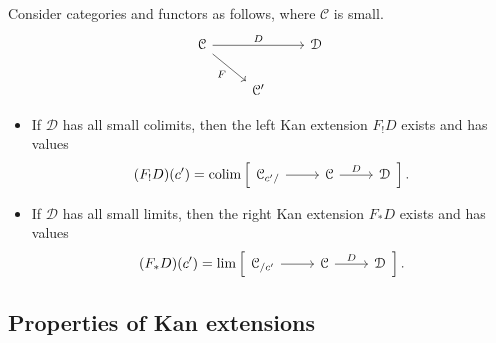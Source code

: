 \documentclass[main.tex]{subfiles}
\begin{document}
\begin{fact}
  \label{fact:pointwise_formula_kan_extensions}
  Consider categories and functors as follows, where $\mathcal{C}$ is small. 
  \begin{equation*}
    \begin{tikzcd}
      \mathcal{C}
      \arrow[dr, swap, "F"]
      \arrow[rr, "D"]
      && \mathcal{D}
      \\
      & \mathcal{C}'
    \end{tikzcd}
  \end{equation*}
  \begin{itemize}
    \item If $\mathcal{D}$ has all small colimits, then the left Kan extension $F_{!}D$ exists and has values
      \begin{equation*}
        (F_{!}D)(c') = \colim \left[ \begin{tikzcd} \mathcal{C}_{c'/} \arrow[r] & \mathcal{C} \arrow[r, "D"] & \mathcal{D} \end{tikzcd} \right].
      \end{equation*}

    \item If $\mathcal{D}$ has all small limits, then the right Kan extension $F_{*}D$ exists and has values
      \begin{equation*}
        (F_{*}D)(c') = \lim \left[ \begin{tikzcd} \mathcal{C}_{/c'} \arrow[r] & \mathcal{C} \arrow[r, "D"] & \mathcal{D} \end{tikzcd} \right].
      \end{equation*}
  \end{itemize}
\end{fact}

\subsection{Properties of Kan extensions}
\label{ssc:properties_of_kan_extensions}
\end{document}
